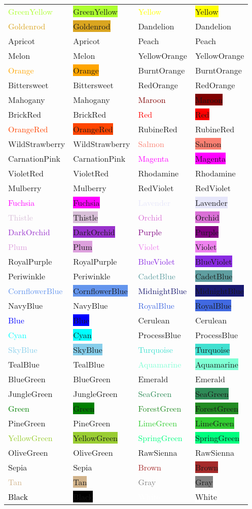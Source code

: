 \documentclass{article}
\begin{document}
\def\colorrow#1{\textcolor[named]{#1}{#1}&\colorbox[named]{#1}{#1}}
\begin{tabular}{ll|ll}
\colorrow{GreenYellow}&
\colorrow{Yellow}\\
\colorrow{Goldenrod}&
\colorrow{Dandelion}\\
\colorrow{Apricot}&
\colorrow{Peach}\\
\colorrow{Melon}&
\colorrow{YellowOrange}\\
\colorrow{Orange}&
\colorrow{BurntOrange}\\
\colorrow{Bittersweet}&
\colorrow{RedOrange}\\
\colorrow{Mahogany}&
\colorrow{Maroon}\\
\colorrow{BrickRed}&
\colorrow{Red}\\
\colorrow{OrangeRed}&
\colorrow{RubineRed}\\
\colorrow{WildStrawberry}&
\colorrow{Salmon}\\
\colorrow{CarnationPink}&
\colorrow{Magenta}\\
\colorrow{VioletRed}&
\colorrow{Rhodamine}\\
\colorrow{Mulberry}&
\colorrow{RedViolet}\\
\colorrow{Fuchsia}&
\colorrow{Lavender}\\
\colorrow{Thistle}&
\colorrow{Orchid}\\
\colorrow{DarkOrchid}&
\colorrow{Purple}\\
\colorrow{Plum}&
\colorrow{Violet}\\
\colorrow{RoyalPurple}&
\colorrow{BlueViolet}\\
\colorrow{Periwinkle}&
\colorrow{CadetBlue}\\
\colorrow{CornflowerBlue}&
\colorrow{MidnightBlue}\\
\colorrow{NavyBlue}&
\colorrow{RoyalBlue}\\
\colorrow{Blue}&
\colorrow{Cerulean}\\
\colorrow{Cyan}&
\colorrow{ProcessBlue}\\
\colorrow{SkyBlue}&
\colorrow{Turquoise}\\
\colorrow{TealBlue}&
\colorrow{Aquamarine}\\
\colorrow{BlueGreen}&
\colorrow{Emerald}\\
\colorrow{JungleGreen}&
\colorrow{SeaGreen}\\
\colorrow{Green}&
\colorrow{ForestGreen}\\
\colorrow{PineGreen}&
\colorrow{LimeGreen}\\
\colorrow{YellowGreen}&
\colorrow{SpringGreen}\\
\colorrow{OliveGreen}&
\colorrow{RawSienna}\\
\colorrow{Sepia}&
\colorrow{Brown}\\
\colorrow{Tan}&
\colorrow{Gray}\\
\colorrow{Black}&
\colorrow{White}\\
\end{tabular}
\end{document}
